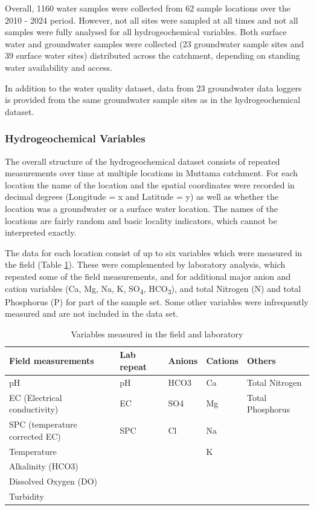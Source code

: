 \documentclass[, manuscript]{copernicus}
\begin{document}
Overall, 1160 water samples were collected from 62 sample locations over
the 2010 - 2024 period. However, not all sites were sampled at all times
and not all samples were fully analysed for all hydrogeochemical
variables. Both surface water and groundwater samples were collected (23
groundwater sample sites and 39 surface water sites) distributed across
the catchment, depending on standing water availability and access.

In addition to the water quality dataset, data from 23 groundwater data
loggers is provided from the same groundwater sample sites as in the
hydrogeochemical dataset.

\subsubsection{Hydrogeochemical Variables}

The overall structure of the hydrogeochemical dataset consists of
repeated measurements over time at multiple locations in Muttama
catchment. For each location the name of the location and the spatial
coordinates were recorded in decimal degrees (Longitude = x and Latitude
= y) as well as whether the location was a groundwater or a surface
water location. The names of the locations are fairly random and basic
locality indicators, which cannot be interpreted exactly.

The data for each location consist of up to six variables which were
measured in the field (Table \ref{tab:TableMeasurements}). These were
complemented by laboratory analysis, which repeated some of the field
measurements, and for additional major anion and cation variables (Ca,
Mg, Na, K, SO\textsubscript{4}, HCO\textsubscript{3}), and total
Nitrogen (N) and total Phosphorus (P) for part of the sample set. Some
other variables were infrequently measured and are not included in the
data set.

\clearpage

\begin{table}
\centering
\caption{\label{tab:TableMeasurements}Variables measured in the field and laboratory}
\centering
\begin{tabular}[t]{l|l|l|l|l}
\hline
Field measurements & Lab repeat & Anions & Cations & Others\\
\hline
pH & pH & HCO3 & Ca & Total Nitrogen\\
\hline
EC (Electrical conductivity) & EC & SO4 & Mg & Total Phosphorus\\
\hline
SPC (temperature corrected EC) & SPC & Cl & Na & \\
\hline
Temperature &  &  & K & \\
\hline
Alkalinity (HCO3) &  &  &  & \\
\hline
Dissolved Oxygen (DO) &  &  &  & \\
\hline
Turbidity &  &  &  & \\
\hline
\end{tabular}
\end{table}
\end{document}
